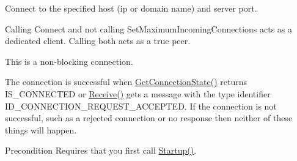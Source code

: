 Connect to the specified host (ip or domain name) and server port. 

Calling Connect and not calling Set\-Maximum\-Incoming\-Connections acts as a dedicated client. Calling both acts as a true peer.

This is a non-\/blocking connection.

The connection is successful when \hyperlink{class_rak_net_1_1_rak_peer_a514c8d6f1dc75b5e9bb3cb5b9dcb632b}{Get\-Connection\-State()} returns I\-S\-\_\-\-C\-O\-N\-N\-E\-C\-T\-E\-D or \hyperlink{class_rak_net_1_1_rak_peer_a46d90fb903e747f76d63eb3a96543740}{Receive()} gets a message with the type identifier I\-D\-\_\-\-C\-O\-N\-N\-E\-C\-T\-I\-O\-N\-\_\-\-R\-E\-Q\-U\-E\-S\-T\-\_\-\-A\-C\-C\-E\-P\-T\-E\-D. If the connection is not successful, such as a rejected connection or no response then neither of these things will happen. \begin{DoxyPrecond}{Precondition}
Requires that you first call \hyperlink{class_rak_net_1_1_rak_peer_a92d493cb617381a6e750f7df6e768927}{Startup()}. 
\end{DoxyPrecond}

